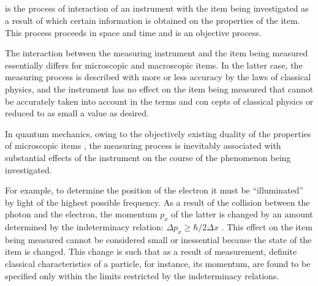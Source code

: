 \subsection{}\label{38.6.7}  is the process of interaction of an instrument with the item being investigated as a result of which certain information is obtained on the properties of the item. This process proceeds in space and time and is an objective process.

The interaction between the measuring instrument and the item
being measured essentially differs for microscopic and macroscopic items. In the latter case, the measuring process is described with more or less accuracy by the laws of classical physics, and the instrument has no effect on the item being measured that cannot be accurately taken into account in the terms and con­ cepts of classical physics or reduced to as small a value as desired.

In quantum mechanics, owing to the objectively existing duality of the properties of microscopic items , the measuring process is inevitably associated with substantial effects of the instrument on the course of the phenomenon being investigated.

For example, to determine the position of the electron it
must be ``illuminated'' by light of the highest possible frequency. As a result of the collision between the photon and the electron, the momentum $p_{x}$ of the latter is changed by an amount determined by the indeterminacy relation: $\Delta p_{x} \geqslant \hbar/2\Delta x$ . This
effect on the item being measured cannot be considered small
or inessential because the state of the item is changed. This
change is such that as a result of measurement, definite classical characteristics of a particle, for instance, its momentum, are found to be specified only within the limits restricted by the indeterminacy relations.

